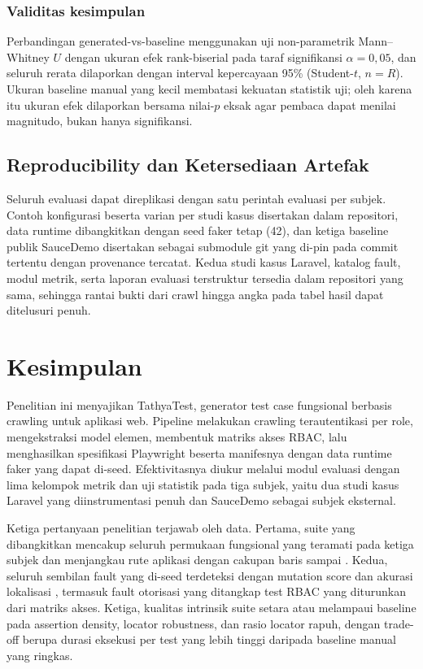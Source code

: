 \documentclass[conference]{IEEEtran}
\begin{document}
\subsubsection{Validitas kesimpulan}
Perbandingan generated-vs-baseline menggunakan uji non-parametrik Mann--Whitney $U$ dengan ukuran efek rank-biserial pada taraf signifikansi $\alpha=0{,}05$, dan seluruh rerata dilaporkan dengan interval kepercayaan 95\% (Student-$t$, $n=R$). Ukuran baseline manual yang kecil membatasi kekuatan statistik uji; oleh karena itu ukuran efek dilaporkan bersama nilai-$p$ eksak agar pembaca dapat menilai magnitudo, bukan hanya signifikansi.

\subsection{Reproducibility dan Ketersediaan Artefak}

Seluruh evaluasi dapat direplikasi dengan satu perintah evaluasi per subjek. Contoh konfigurasi beserta varian per studi kasus disertakan dalam repositori, data runtime dibangkitkan dengan seed faker tetap (42), dan ketiga baseline publik SauceDemo disertakan sebagai submodule git yang di-pin pada commit tertentu dengan provenance tercatat. Kedua studi kasus Laravel, katalog fault, modul metrik, serta laporan evaluasi terstruktur tersedia dalam repositori yang sama, sehingga rantai bukti dari crawl hingga angka pada tabel hasil dapat ditelusuri penuh.

\section{Kesimpulan}

Penelitian ini menyajikan TathyaTest, generator test case fungsional berbasis crawling untuk aplikasi web. Pipeline melakukan crawling terautentikasi per role, mengekstraksi model elemen, membentuk matriks akses RBAC, lalu menghasilkan spesifikasi Playwright beserta manifesnya dengan data runtime faker yang dapat di-seed. Efektivitasnya diukur melalui modul evaluasi dengan lima kelompok metrik dan uji statistik pada tiga subjek, yaitu dua studi kasus Laravel yang diinstrumentasi penuh dan SauceDemo sebagai subjek eksternal.

Ketiga pertanyaan penelitian terjawab oleh data. Pertama, suite yang dibangkitkan mencakup seluruh permukaan fungsional yang teramati pada ketiga subjek dan menjangkau \evBladeRouteExecCov{} rute aplikasi dengan cakupan baris \evBladeLineCov{} sampai \evInertiaLineCov{}. Kedua, seluruh sembilan fault yang di-seed terdeteksi dengan mutation score \evBladeMutScore{} dan akurasi lokalisasi \evBladeFaultLoc{}, termasuk fault otorisasi yang ditangkap test RBAC yang diturunkan dari matriks akses. Ketiga, kualitas intrinsik suite setara atau melampaui baseline pada assertion density, locator robustness, dan rasio locator rapuh, dengan trade-off berupa durasi eksekusi per test yang lebih tinggi daripada baseline manual yang ringkas.
\end{document}
